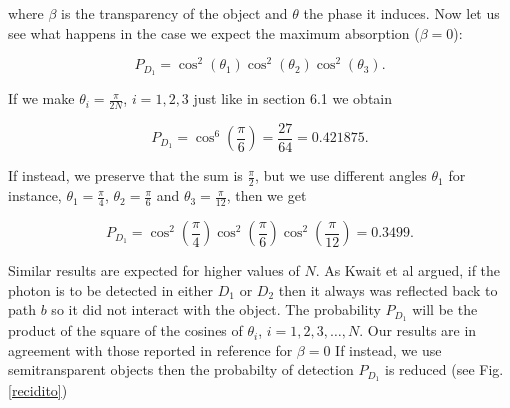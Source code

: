 \documentclass[12pt]{book}
\begin{document}
where $\beta$ is the transparency of the object and $\theta$ the phase it induces. Now let us see what happens in the case we expect the maximum absorption ($\beta=0$): 

\begin{equation}
P_{D_{1}}=\cos^{2}{\left(\theta_{1} \right)} \cos^{2}{\left(\theta_{2} \right)} \cos^{2}{\left(\theta_{3} \right)}.
\end{equation}

If we make $\theta_{i}=\frac{\pi}{2N}$, $i=1, 2, 3$ just like in section 6.1 we obtain

\begin{equation}
P_{D_{1}}=\cos^{6}{\left(\frac{\pi}{6} \right)}=\frac{27}{64}=0.421875.
\end{equation} 

If instead, we preserve that the sum is $\frac{\pi}{2}$,  but we use different angles $\theta_{1}$ for instance, $\theta_{1}=\frac{\pi}{4}$, $\theta_{2}=\frac{\pi}{6}$ and $\theta_{3}=\frac{\pi}{12}$, then we get 

\begin{equation}
P_{D_{1}}=\cos^{2}{\left(\frac{\pi}{4} \right)} \cos^{2}{\left(\frac{\pi}{6} \right)} \cos^{2}{\left(\frac{\pi}{12} \right)}=0.3499.
\end{equation}

Similar results are expected for higher values of $N$. As Kwait et al \cite{exp} argued, if the photon is to be detected in either $D_{1}$ or $D_{2}$ then it always was reflected back to path $b$ so it did not interact with the object. The probability $P_{D_{1}}$ will be the product of the square of the cosines of $\theta_{i}$, $i=1,2,3,\dots,N$. Our results are in agreement with those reported in reference \cite{exp} for $\beta=0$ If instead, we use semitransparent objects then the probabilty of detection $P_{D_{1}}$ is reduced (see Fig. \ref{recidito})
\end{document}
